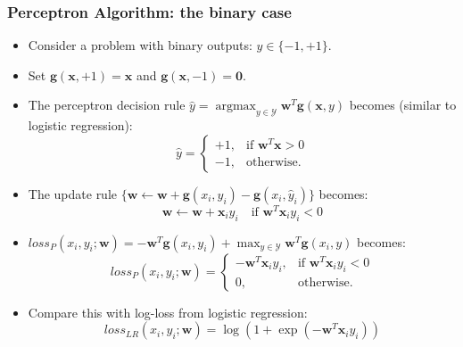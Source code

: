 \documentclass[ignorenonframetext,plain]{beamer}
\DeclareMathOperator*{\argmax}{argmax}
\newcommand{\loss}{\mathit{loss}}
\renewcommand{\vec}{\mathbf}
\begin{document}
\begin{frame}\frametitle{Perceptron Algorithm: the binary case}
\begin{itemize}
\item Consider a problem with binary outputs: $y\in\{-1,+1\}$.
\item Set $\vec{g}(\vec{x}, +1) = \vec{x}$ and $\vec{g}(\vec{x}, -1) = \vec{0}$.
\item The perceptron decision rule $\hat{y} =
  \argmax_{y\in\mathcal{Y}} \vec{w}^T \vec{g}(\vec{x}, y)$ becomes
  (similar to logistic regression): \[ 
\hat{y} = \begin{cases}
+1,& \text{if } \vec{w}^T \vec{x} > 0\\
-1,& \text{otherwise.}
\end{cases}
\]
\item The update rule $\{\vec{w} \leftarrow \vec{w} 
+\vec{g}(x_i,y_i)
-\vec{g}(x_i,\hat{y}_i)\}$ becomes: \[
\vec{w} \leftarrow \vec{w} 
+ \vec{x}_i y_i
\quad\text{if } \vec{w}^T\vec{x}_i y_i < 0
\]
\item $\loss_P(x_i, y_i; \vec{w}) = 
-\vec{w}^T \vec{g}(x_i,y_i)
+\max_{y\in\mathcal{Y}} \vec{w}^T \vec{g}(x_i,y)$
becomes: \[
\loss_P(x_i, y_i; \vec{w}) = \begin{cases}
-\vec{w}^T\vec{x}_i y_i,& \text{if } \vec{w}^T\vec{x}_i y_i<0 \\
0,& \text{otherwise.}
\end{cases}
\]
\item Compare this with log-loss from logistic regression: \[
  \loss_{LR}(x_i, y_i; \vec{w}) = \log(1 + \exp(-\vec{w}^T\vec{x}_i y_i))
\]
\end{itemize}
\end{frame}
\end{document}

